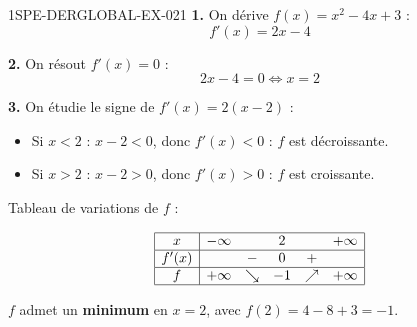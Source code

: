 \begin{corrige}{1SPE-DERGLOBAL-EX-021}
\textbf{1.} On dérive $f(x) = x^2 - 4x + 3$ :
\[
f'(x) = 2x - 4
\]

\textbf{2.} On résout $f'(x) = 0$ :
\[
2x - 4 = 0 \iff x = 2
\]

\textbf{3.} On étudie le signe de $f'(x) = 2(x - 2)$ :
\begin{itemize}
\item Si $x < 2$ : $x - 2 < 0$, donc $f'(x) < 0$ : $f$ est décroissante.
\item Si $x > 2$ : $x - 2 > 0$, donc $f'(x) > 0$ : $f$ est croissante.
\end{itemize}

Tableau de variations de $f$ :

\[
\begin{array}{|c|ccccc|}
\hline
x & -\infty & & 2 & & +\infty \\
\hline
f'(x) & & - & 0 & + & \\
\hline
f & +\infty & \searrow & -1 & \nearrow & +\infty \\
\hline
\end{array}
\]

$f$ admet un \textbf{minimum} en $x = 2$, avec $f(2) = 4 - 8 + 3 = \boxed{-1}$.
\end{corrige}
